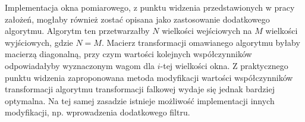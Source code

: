 Implementacja okna pomiarowego, z punktu widzenia przedstawionych w pracy założeń, mogłaby również zostać opisana jako zastosowanie dodatkowego algorytmu. Algorytm ten przetwarzałby $N$ wielkości wejściowych na $M$ wielkości wyjściowych, gdzie $N = M$. Macierz transformacji omawianego algorytmu byłaby macierzą diagonalną, przy czym wartości kolejnych współczynników odpowiadałyby wyznaczonym wagom dla $i$-tej wielkości okna. Z praktycznego punktu widzenia zaproponowana metoda modyfikacji wartości współczynników transformacji algorytmu transformacji falkowej wydaje się jednak bardziej optymalna. Na tej samej zasadzie istnieje możliwość implementacji innych modyfikacji, np. wprowadzenia dodatkowego filtru.
